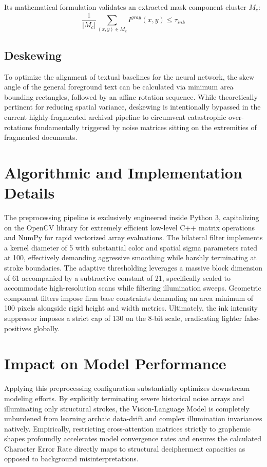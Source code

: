 \documentclass[journal, onecolumn]{IEEEtran}
\begin{document}
Its mathematical formulation validates an extracted mask component cluster $M_c$:
\begin{equation}
\frac{1}{|M_c|} \sum_{(x,y) \in M_c} I^{gray}(x,y) \leq \tau_{ink}
\end{equation}

\subsection{Deskewing}
To optimize the alignment of textual baselines for the neural network, the skew angle of the general foreground text can be calculated via minimum area bounding rectangles, followed by an affine rotation sequence. While theoretically pertinent for reducing spatial variance, deskewing is intentionally bypassed in the current highly-fragmented archival pipeline to circumvent catastrophic over-rotations fundamentally triggered by noise matrices sitting on the extremities of fragmented documents.

\section{Algorithmic and Implementation Details}
The preprocessing pipeline is exclusively engineered inside Python 3, capitalizing on the OpenCV library for extremely efficient low-level C++ matrix operations and NumPy for rapid vectorized array evaluations. The bilateral filter implements a kernel diameter of 5 with substantial color and spatial sigma parameters rated at 100, effectively demanding aggressive smoothing while harshly terminating at stroke boundaries. The adaptive thresholding leverages a massive block dimension of 61 accompanied by a subtractive constant of 21, specifically scaled to accommodate high-resolution scans while filtering illumination sweeps. Geometric component filters impose firm base constraints demanding an area minimum of 100 pixels alongside rigid height and width metrics. Ultimately, the ink intensity suppressor imposes a strict cap of 130 on the 8-bit scale, eradicating lighter false-positives globally.

\section{Impact on Model Performance}
Applying this preprocessing configuration substantially optimizes downstream modeling efforts. By explicitly terminating severe historical noise arrays and illuminating only structural strokes, the Vision-Language Model is completely unburdened from learning archaic data-drift and complex illumination invariances natively. Empirically, restricting cross-attention matrices strictly to graphemic shapes profoundly accelerates model convergence rates and ensures the calculated Character Error Rate directly maps to structural decipherment capacities as opposed to background misinterpretations.
\end{document}
